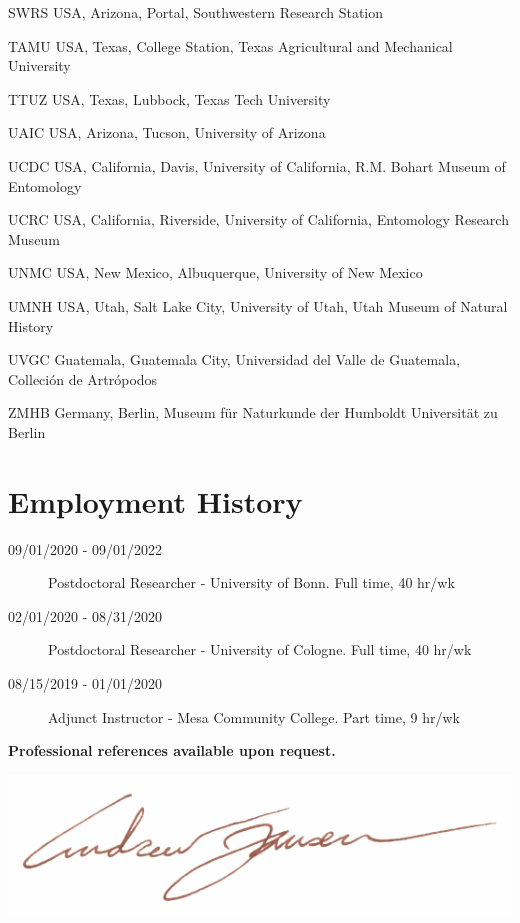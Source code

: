 \documentclass[12pt,a4paper]{article}
\begin{document}
\begin{collections}
			\item [SWRS] USA, Arizona, Portal, Southwestern Research Station
			\item [TAMU] USA, Texas, College Station, Texas Agricultural and Mechanical University
			\item [TTUZ] USA, Texas, Lubbock, Texas Tech University
			\item [UAIC] USA, Arizona, Tucson, University of Arizona
			\item [UCDC] USA, California, Davis, University of California, R.M. Bohart Museum of Entomology
			\item [UCRC] USA, California, Riverside, University of California, Entomology Research Museum
			\item [UNMC] USA, New Mexico, Albuquerque, University of New Mexico
			\item [UMNH] USA, Utah, Salt Lake City, University of Utah, Utah Museum of Natural History
			\item [UVGC] Guatemala, Guatemala City, Universidad del Valle de Guatemala, Colleci\'{o}n de Artr\'{o}podos
			\item [ZMHB] Germany, Berlin, Museum f\"{u}r Naturkunde der Humboldt Universit\"{a}t zu Berlin
		\end{collections}

\section*{Employment History}
	\begin{description}
		\item [09/01/2020 - 09/01/2022] Postdoctoral Researcher - University of Bonn. Full time, 40 hr/wk
		\item [02/01/2020 - 08/31/2020] Postdoctoral Researcher - University of Cologne. Full time, 40 hr/wk
		\item [08/15/2019 - 01/01/2020] Adjunct Instructor - Mesa Community College. Part time, 9 hr/wk
	\end{description}

\vspace{1cm}

\noindent\large{\textbf{Professional references available upon request.}}

\vspace*{1cm}
\includegraphics[scale=1]{signature.pdf}\\
\end{document}
